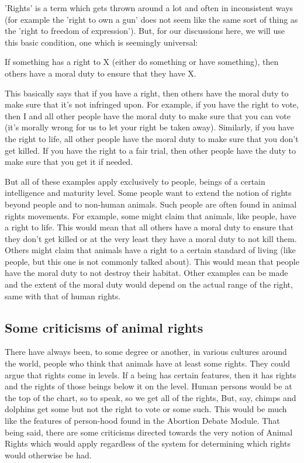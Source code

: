 'Rights’ is a term which gets thrown around a lot and often in inconsistent ways (for example the 'right to own a gun' does not seem like the same sort of thing as the 'right to freedom of expression'). But, for our discussions here, we will use this basic condition, one which is seemingly universal:

\begin{center}If something has a right to X (either do something or have something), then others have a moral duty to ensure that they have X.\end{center}

This basically says that if you have a right, then others have the moral duty to make sure that it's not infringed upon. For example, if you have the right to vote, then I and all other people have the moral duty to make sure that you can vote (it's morally wrong for us to let your right be taken away). Similarly, if you have the right to life, all other people have the moral duty to make sure that you don't get killed. If you have the right to a fair trial, then other people have the duty to make sure that you get it if needed.

But all of these examples apply exclusively to people, beings of a certain intelligence and maturity level. Some people want to extend the notion of rights beyond people and to non-human animals. Such people are often found in animal rights movements. For example, some might claim that animals, like people, have a right to life. This would mean that all others have a moral duty to ensure that they don't get killed or at the very least they have a moral duty to not kill them. Others might claim that animals have a right to a certain standard of living (like people, but this one is not commonly talked about). This would mean that people have the moral duty to not destroy their habitat. Other examples can be made and the extent of the moral duty would depend on the actual range of the right, same with that of human rights. 
\subsection{Some criticisms of animal rights}

There have always been, to some degree or another, in various cultures around the world, people who think that animals have at least some rights. They could argue that rights come in levels. If a being has certain features, then it has rights and the rights of those beings below it on the level. Human persons would be at the top of the chart, so to speak, so we get all of the rights, But, say, chimps and dolphins get some but not the right to vote or some such. This would be much like the features of person-hood found in the Abortion Debate Module. That being said, there are some criticisms directed towards the very notion of Animal Rights which would apply regardless of the system for determining which rights would otherwise be had. 
